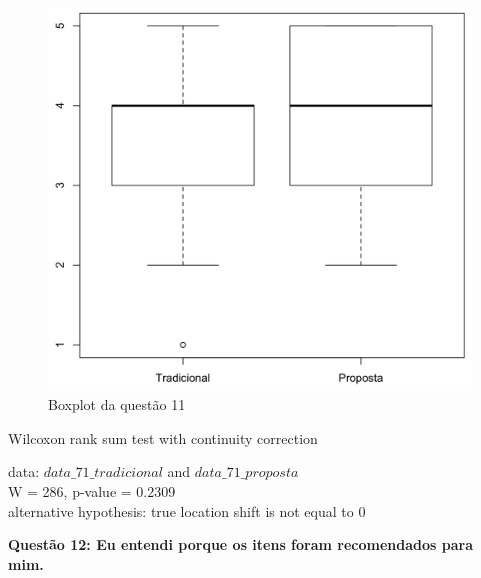 \begin{figure}[htb]
  \caption{\label{fig:questao11-boxplot}Boxplot da questão 11}
  \begin{center}
      \includegraphics[scale=0.6]{./Figuras/questao11-boxplot.png}
  \end{center}
\end{figure}

Wilcoxon rank sum test with continuity correction

data:  $data\_71\_tradicional$ and $data\_71\_proposta$\\
W = 286, p-value = 0.2309\\
alternative hypothesis: true location shift is not equal to 0

\newpage
\textbf{Questão 12: Eu entendi porque os itens foram recomendados para mim.}


